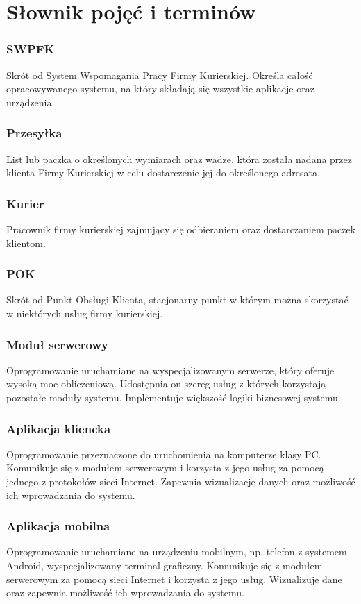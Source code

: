 \section{Słownik pojęć i terminów}
\subsubsection*{SWPFK}
Skrót od System Wspomagania Pracy Firmy Kurierskiej. Określa całość opracowywanego systemu, na który składają się wszystkie aplikacje oraz urządzenia.

\subsubsection*{Przesyłka}
List lub paczka o określonych wymiarach oraz wadze, która została nadana przez klienta Firmy Kurierskiej w celu dostarczenie jej do określonego adresata.

\subsubsection*{Kurier}
Pracownik firmy kurierskiej zajmujący się odbieraniem oraz dostarczaniem paczek klientom.

\subsubsection*{POK}
Skrót od Punkt Obsługi Klienta, stacjonarny punkt w którym można skorzystać w niektórych usług firmy kurierskiej.

\subsubsection*{Moduł serwerowy}
Oprogramowanie uruchamiane na wyspecjalizowanym serwerze, który oferuje wysoką moc obliczeniową. Udostępnia on szereg usług z których korzystają pozostałe moduły systemu. Implementuje większość logiki biznesowej systemu.

\subsubsection*{Aplikacja kliencka}
Oprogramowanie przeznaczone do uruchomienia na komputerze klasy PC. Komunikuje się z modułem serwerowym i korzysta z jego usług za pomocą jednego z protokołów sieci Internet. Zapewnia wizualizację danych oraz możliwość ich wprowadzania do systemu.

\subsubsection*{Aplikacja mobilna}
Oprogramowanie uruchamiane na urządzeniu mobilnym, np. telefon z systemem Android, wyspecjalizowany terminal graficzny. Komunikuje się z modułem serwerowym za pomocą sieci Internet i korzysta z jego usług. Wizualizuje dane oraz zapewnia możliwość ich wprowadzania do systemu.

